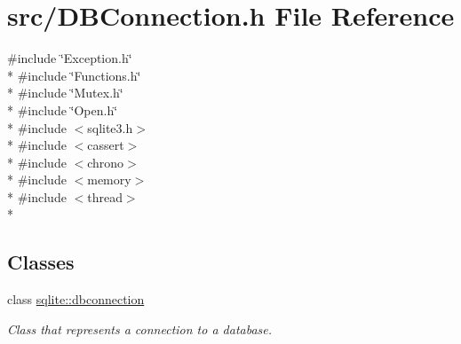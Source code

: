 \hypertarget{a00022}{\section{src/\-D\-B\-Connection.h File Reference}
\label{a00022}
}
{\ttfamily \#include \char`\"{}Exception.\-h\char`\"{}}\\*
{\ttfamily \#include \char`\"{}Functions.\-h\char`\"{}}\\*
{\ttfamily \#include \char`\"{}Mutex.\-h\char`\"{}}\\*
{\ttfamily \#include \char`\"{}Open.\-h\char`\"{}}\\*
{\ttfamily \#include $<$sqlite3.\-h$>$}\\*
{\ttfamily \#include $<$cassert$>$}\\*
{\ttfamily \#include $<$chrono$>$}\\*
{\ttfamily \#include $<$memory$>$}\\*
{\ttfamily \#include $<$thread$>$}\\*
\subsection*{Classes}
\begin{DoxyCompactItemize}
\item 
class \hyperlink{a00004}{sqlite\-::dbconnection}
\begin{DoxyCompactList}\small\item\em Class that represents a connection to a database. \end{DoxyCompactList}\end{DoxyCompactItemize}
